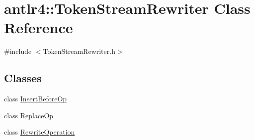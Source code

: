 \hypertarget{classantlr4_1_1TokenStreamRewriter}{}\section{antlr4\+:\+:Token\+Stream\+Rewriter Class Reference}
\label{classantlr4_1_1TokenStreamRewriter}


{\ttfamily \#include $<$Token\+Stream\+Rewriter.\+h$>$}

\subsection*{Classes}
\begin{DoxyCompactItemize}
\item 
class \hyperlink{classantlr4_1_1TokenStreamRewriter_1_1InsertBeforeOp}{Insert\+Before\+Op}
\item 
class \hyperlink{classantlr4_1_1TokenStreamRewriter_1_1ReplaceOp}{Replace\+Op}
\item 
class \hyperlink{classantlr4_1_1TokenStreamRewriter_1_1RewriteOperation}{Rewrite\+Operation}
\end{DoxyCompactItemize}
